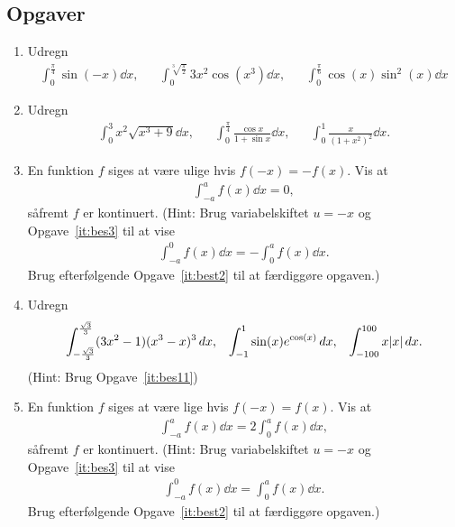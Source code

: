 \subsection{Opgaver}

\begin{enumerate}
	\item Udregn
	\begin{align*}
	\int_{0}^{\frac{\pi}{4}} \sin(-x) \dd x,&& \int_{0}^{\sqrt[3]{\frac{\pi}{2}}} 3x^2\cos(x^3) \dd x,&& \int_{0}^{\frac{\pi}{6}}\cos(x)\sin^2(x) \dd x
	\end{align*}
	
	
	
	\item Udregn
	\begin{align*}
	\int_0^3 x^2\sqrt{x^3+9}\dd x,&& \int_0^\frac{\pi}{4} \frac{\cos x}{1+\sin x} \dd x,&& \int_0^1 \frac{x}{(1+x^2)^2}\dd x.
	\end{align*}
	
	\item\label{it:bes11} En funktion $f$ siges at være ulige hvis $f(-x)=-f(x)$. Vis at
	\begin{align*}
	\int_{-a}^{a}f(x)\dd x=0,
	\end{align*}
	såfremt $f$ er kontinuert.
	(Hint: Brug variabelskiftet $u=-x$ og Opgave~\ref{it:bes3} til at vise 
	\begin{align*}
	\int_{-a}^{0}f(x)\dd x=-\int_{0}^{a}f(x)\dd x.
	\end{align*}
	Brug efterfølgende Opgave~\ref{it:best2} til at færdiggøre opgaven.)
	
	\item Udregn
	\begin{align*}
	\int_{-\frac{\sqrt{3}}{3}}^{\frac{\sqrt{3}}{3}} (3x^2-1)(x^3-x)^3 \,d x,&& \int_{-1}^{1} \sin(x)e^{\cos(x)}\,d x,&& \int_{-100}^{100} x\vert x\vert\,d x.
	\end{align*}
	(Hint: Brug Opgave~\ref{it:bes11})
	
	
	\item\label{it:bes12} En funktion $f$ siges at være lige hvis $f(-x)=f(x)$. Vis at
	\begin{align*}
	\int_{-a}^{a} f(x)\dd x =2\int_{0}^{a}f(x) \dd x,
	\end{align*}
		såfremt $f$ er kontinuert.
	(Hint: Brug variabelskiftet $u=-x$ og Opgave~\ref{it:bes3} til at vise 
	\begin{align*}
	\int_{-a}^{0}f(x)\dd x=\int_{0}^{a}f(x)\dd x.
	\end{align*}
	Brug efterfølgende Opgave~\ref{it:best2} til at færdiggøre opgaven.)
	

\end{enumerate}
